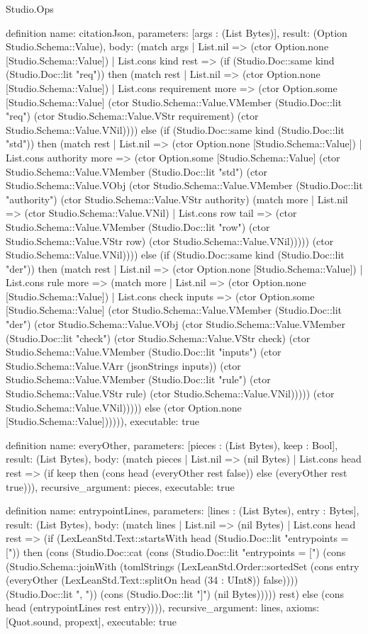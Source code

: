 \begin{lexlean}{Studio.Ops}
\begin{semanticmodule}
definition{
  name: citationJson,
  parameters: [args : (List Bytes)],
  result: (Option Studio.Schema::Value),
  body: (match args
    | List.nil => (ctor Option.none [Studio.Schema::Value])
    | List.cons kind rest => (if (Studio.Doc::same kind (Studio.Doc::lit "req")) then (match rest
      | List.nil => (ctor Option.none [Studio.Schema::Value])
      | List.cons requirement more => (ctor Option.some [Studio.Schema::Value] (ctor Studio.Schema::Value.VMember (Studio.Doc::lit "req") (ctor Studio.Schema::Value.VStr requirement) (ctor Studio.Schema::Value.VNil)))) else (if (Studio.Doc::same kind (Studio.Doc::lit "std")) then (match rest
      | List.nil => (ctor Option.none [Studio.Schema::Value])
      | List.cons authority more => (ctor Option.some [Studio.Schema::Value] (ctor Studio.Schema::Value.VMember (Studio.Doc::lit "std") (ctor Studio.Schema::Value.VObj (ctor Studio.Schema::Value.VMember (Studio.Doc::lit "authority") (ctor Studio.Schema::Value.VStr authority) (match more
        | List.nil => (ctor Studio.Schema::Value.VNil)
        | List.cons row tail => (ctor Studio.Schema::Value.VMember (Studio.Doc::lit "row") (ctor Studio.Schema::Value.VStr row) (ctor Studio.Schema::Value.VNil))))) (ctor Studio.Schema::Value.VNil)))) else (if (Studio.Doc::same kind (Studio.Doc::lit "der")) then (match rest
      | List.nil => (ctor Option.none [Studio.Schema::Value])
      | List.cons rule more => (match more
        | List.nil => (ctor Option.none [Studio.Schema::Value])
        | List.cons check inputs => (ctor Option.some [Studio.Schema::Value] (ctor Studio.Schema::Value.VMember (Studio.Doc::lit "der") (ctor Studio.Schema::Value.VObj (ctor Studio.Schema::Value.VMember (Studio.Doc::lit "check") (ctor Studio.Schema::Value.VStr check) (ctor Studio.Schema::Value.VMember (Studio.Doc::lit "inputs") (ctor Studio.Schema::Value.VArr (jsonStrings inputs)) (ctor Studio.Schema::Value.VMember (Studio.Doc::lit "rule") (ctor Studio.Schema::Value.VStr rule) (ctor Studio.Schema::Value.VNil))))) (ctor Studio.Schema::Value.VNil))))) else (ctor Option.none [Studio.Schema::Value]))))),
  executable: true
}


definition{
  name: everyOther,
  parameters: [pieces : (List Bytes), keep : Bool],
  result: (List Bytes),
  body: (match pieces
    | List.nil => (nil Bytes)
    | List.cons head rest => (if keep then (cons head (everyOther rest false)) else (everyOther rest true))),
  recursive_argument: pieces,
  executable: true
}

definition{
  name: entrypointLines,
  parameters: [lines : (List Bytes), entry : Bytes],
  result: (List Bytes),
  body: (match lines
    | List.nil => (nil Bytes)
    | List.cons head rest => (if (LexLeanStd.Text::startsWith head (Studio.Doc::lit "entrypoints = [")) then (cons (Studio.Doc::cat (cons (Studio.Doc::lit "entrypoints = [") (cons (Studio.Schema::joinWith (tomlStrings (LexLeanStd.Order::sortedSet (cons entry (everyOther (LexLeanStd.Text::splitOn head (34 : UInt8)) false)))) (Studio.Doc::lit ", ")) (cons (Studio.Doc::lit "]") (nil Bytes))))) rest) else (cons head (entrypointLines rest entry)))),
  recursive_argument: lines,
  axioms: [Quot.sound, propext],
  executable: true
}



\end{semanticmodule}
\end{lexlean}
